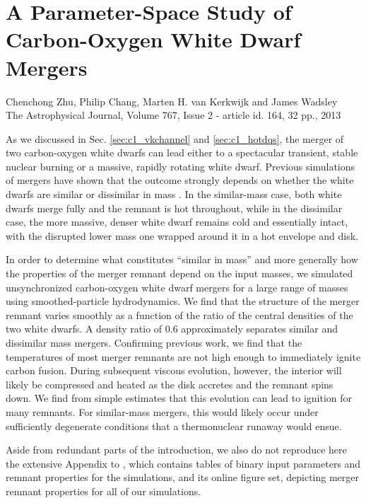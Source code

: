 \chapter{A Parameter-Space Study of Carbon-Oxygen White Dwarf Mergers}
\label{ch:ch2}

\begin{center}
\begin{minipage}[c]{4.75in}
Chenchong Zhu, Philip Chang, Marten H. van Kerkwijk and James Wadsley\\
The Astrophysical Journal, Volume 767, Issue 2 - article id. 164, 32 pp., 2013 \citep{zhu+13}
\vspace{2em}
\end{minipage}
\end{center}

As we discussed in Sec. \ref{sec:c1_vkchannel} and \ref{sec:c1_hotdqs}, the merger of two carbon-oxygen white dwarfs can lead either to a spectacular transient, stable nuclear burning or a massive, rapidly rotating white dwarf.  Previous simulations of mergers have shown that the outcome strongly depends on whether the white dwarfs are similar or dissimilar in mass \citep{loreig09}.  In the similar-mass case, both white dwarfs merge fully and the remnant is hot throughout, while in the dissimilar case, the more massive, denser white dwarf remains cold and essentially intact, with the disrupted lower mass one wrapped around it in a hot envelope and disk.

In order to determine what constitutes ``similar in mass'' and more generally how the properties of the merger remnant depend on the input masses, we simulated unsynchronized carbon-oxygen white dwarf mergers for a large range of masses using smoothed-particle hydrodynamics.  We find that the structure of the merger remnant varies smoothly as a function of the ratio of the central densities of the two white dwarfs.  A density ratio of 0.6 approximately separates similar and dissimilar mass mergers.  Confirming previous work, we find that the temperatures of most merger remnants are not high enough to immediately ignite carbon fusion.  During subsequent viscous evolution, however, the interior will likely be compressed and heated as the disk accretes and the remnant spins down.  We find from simple estimates that this evolution can lead to ignition for many remnants.  For similar-mass mergers, this would likely occur under sufficiently degenerate conditions that a thermonuclear runaway would ensue.

Aside from redundant parts of the introduction, we also do not reproduce here the extensive Appendix to \cite{zhu+13}, which contains tables of binary input parameters and remnant properties for the simulations, and its online figure set, depicting merger remnant properties for all of our simulations.
